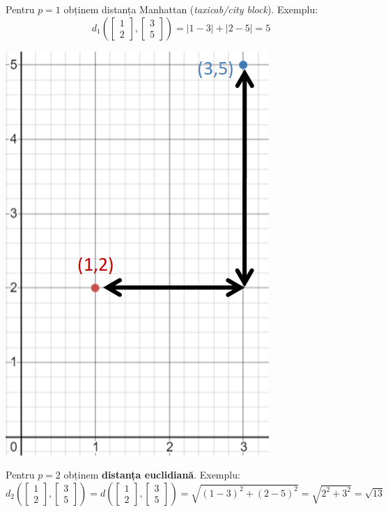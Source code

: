 \documentclass[12pt]{article}
\begin{document}
	Pentru $p=1$ obținem distanța Manhattan (\textit{taxicab/city block}). Exemplu:
	$$d_1\left( \begin{bmatrix}
	1\\
	2
	\end{bmatrix}, \begin{bmatrix}
	3\\
	5
	\end{bmatrix} \right) = |1 - 3| + |2 - 5| = 5$$
\begin{center}
	\includegraphics{screenshot001}
\end{center}


	Pentru $p=2$ obținem \textbf{distanța euclidiană}. Exemplu:
	$$d_2 \left( \begin{bmatrix}
		1\\
		2
		\end{bmatrix}, \begin{bmatrix}
		3\\
		5
		\end{bmatrix} \right) = d \left( \begin{bmatrix}
		1\\
		2
		\end{bmatrix}, \begin{bmatrix}
		3\\
		5
		\end{bmatrix} \right) = \sqrt{(1-3)^2 + (2-5)^2} = \sqrt{2^2 + 3^2} = \sqrt{13}$$
	
\end{document}

